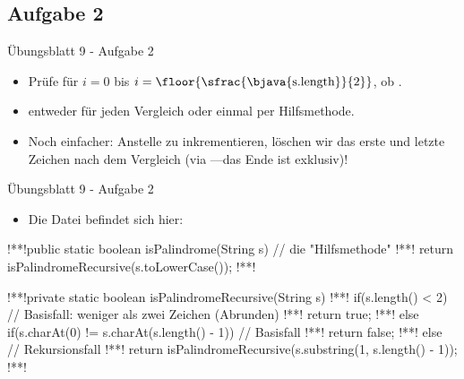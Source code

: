 \subsection{Aufgabe 2}
\iffull
\begin{frame}[c,fragile]{Übungsblatt 9 - Aufgabe 2}
    \bigskip

    \footnotesize\begin{itemize}
        \item<5-> Prüfe für \(i = 0\) bis \(i = \floor{\sfrac{\text{\bjava{s.length}}}{2}}\), ob .
        \item<6->  entweder für jeden Vergleich oder einmal per Hilfsmethode.
        \item<7-> Noch einfacher: Anstelle  zu inkrementieren, löschen wir das erste und letzte Zeichen nach dem Vergleich (via ---das Ende ist exklusiv)!
    \end{itemize}
\end{frame}
\fi

\begin{frame}[fragile]{Übungsblatt 9 - Aufgabe 2}
    \begin{itemize}[<+(1)->]
        \item Die Datei befindet sich hier: 
    \end{itemize}\vfill
\SetupLstHl{}%
\begin{plainjava}
!**!public static boolean isPalindrome(String s) { // die "Hilfsmethode"
!**!    return isPalindromeRecursive(s.toLowerCase());
!**!}


!**!private static boolean isPalindromeRecursive(String s) {
!**!    if(s.length() < 2) // Basisfall: weniger als zwei Zeichen (Abrunden)
!**!        return true;
!**!    else if(s.charAt(0) != s.charAt(s.length() - 1)) // Basisfall
!**!        return false;
!**!    else // Rekursionsfall
!**!        return isPalindromeRecursive(s.substring(1, s.length() - 1));
!**!}
\end{plainjava}
\vfill\null
\end{frame}

